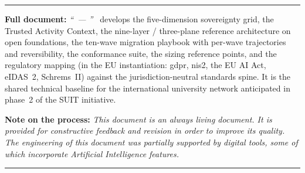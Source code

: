 \documentclass[11pt,a4paper,twoside]{article}
\begin{document}
\vspace{0.4em}
\noindent\rule{\textwidth}{0.4pt}

{\footnotesize\textbf{Full document:} \emph{``\suitsolutiontitle\ ---
\suitsolutionsubtitle''}~\cite{ng-tech-ref-2026}
develops the five-dimension sovereignty grid, the Trusted Activity Context,
the nine-layer / three-plane reference architecture on open foundations, the
ten-wave migration playbook with per-wave trajectories and reversibility, the
conformance suite, the sizing reference points, and the regulatory mapping
(in the EU instantiation: \gls{gdpr}, \gls{nis2}, the EU AI Act, eIDAS~2, Schrems~II) against the
jurisdiction-neutral standards spine. It is the shared technical baseline for
the international university network anticipated in phase~2 of the SUIT
initiative.}

\smallskip

{\footnotesize\textbf{Note on the process:}
\textit{This document is an always living document. It is provided for
constructive feedback and revision in order to improve its quality. The
engineering of this document was partially supported by digital tools, some
of which incorporate Artificial Intelligence features.}}

\vspace{0.6em}
\noindent\rule{\textwidth}{0.4pt}
\printbibliography[title={\normalsize References}]
\end{document}
